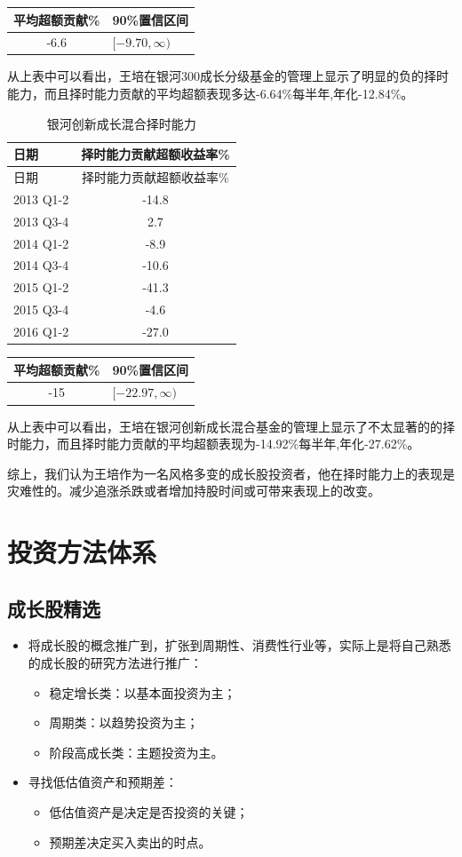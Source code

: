 \documentclass[hyperref,]{ctexart}
\begin{document}
\begin{longtable}[]{@{}cl@{}}
\toprule
平均超额贡献\% & 90\%置信区间\tabularnewline
\midrule
\endhead
-6.6 & \([-9.70,\infty)\)\tabularnewline
\bottomrule
\end{longtable}

从上表中可以看出，王培在银河300成长分级基金的管理上显示了明显的负的择时能力，而且择时能力贡献的平均超额表现多达-6.64\%每半年,年化-12.84\%。

\begin{longtable}[]{@{}lc@{}}
\caption{银河创新成长混合择时能力}\tabularnewline
\toprule
日期 & 择时能力贡献超额收益率\%\tabularnewline
\midrule
\endfirsthead
\toprule
日期 & 择时能力贡献超额收益率\%\tabularnewline
\midrule
\endhead
2013 Q1-2 & -14.8\tabularnewline
2013 Q3-4 & 2.7\tabularnewline
2014 Q1-2 & -8.9\tabularnewline
2014 Q3-4 & -10.6\tabularnewline
2015 Q1-2 & -41.3\tabularnewline
2015 Q3-4 & -4.6\tabularnewline
2016 Q1-2 & -27.0\tabularnewline
\bottomrule
\end{longtable}

\begin{longtable}[]{@{}cl@{}}
\toprule
平均超额贡献\% & 90\%置信区间\tabularnewline
\midrule
\endhead
-15 & \([-22.97,\infty)\)\tabularnewline
\bottomrule
\end{longtable}

从上表中可以看出，王培在银河创新成长混合基金的管理上显示了不太显著的的择时能力，而且择时能力贡献的平均超额表现为-14.92\%每半年,年化-27.62\%。

综上，我们认为王培作为一名风格多变的成长股投资者，他在择时能力上的表现是灾难性的。减少追涨杀跌或者增加持股时间或可带来表现上的改变。

\section{投资方法体系}

\subsection{成长股精选}

\begin{itemize}
\item 将成长股的概念推广到，扩张到周期性、消费性行业等，实际上是将自己熟悉的成长股的研究方法进行推广：
\begin{itemize}
  \item 稳定增长类：以基本面投资为主；
  \item 周期类：以趋势投资为主；
  \item 阶段高成长类：主题投资为主。
  \end{itemize}
\item 寻找低估值资产和预期差：
\begin{itemize}
  \item 低估值资产是决定是否投资的关键；
  \item 预期差决定买入卖出的时点。
\end{itemize}

\end{itemize}
\end{document}
